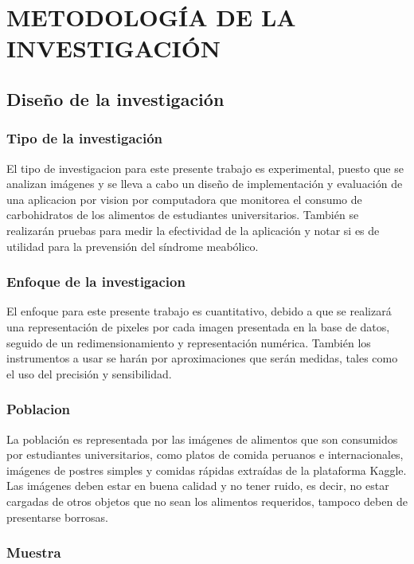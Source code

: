 

\chapter{METODOLOGÍA DE LA INVESTIGACIÓN}

\section{Diseño de la investigación}

\subsection{Tipo de la investigación}

El tipo de investigacion para este presente trabajo es experimental, puesto que se  analizan imágenes y se lleva a cabo un diseño de implementación y evaluación de una aplicacion por vision por computadora que monitorea el consumo de carbohidratos de los alimentos de estudiantes universitarios. También se realizarán pruebas para medir la efectividad de la aplicación y notar si es de utilidad para la prevensión del síndrome meabólico.

\subsection{Enfoque de la investigacion}

El enfoque para este presente trabajo es cuantitativo, debido a que se realizará una representación de pixeles por cada imagen  presentada en la base de datos, seguido de un redimensionamiento y representación numérica. También los instrumentos a usar se harán por aproximaciones que serán medidas, tales como el uso del precisión y sensibilidad. 

\subsection{Poblacion}

La población es representada por las imágenes de alimentos que son consumidos por estudiantes universitarios, como platos de comida peruanos e internacionales, imágenes de postres simples y comidas rápidas extraídas de la plataforma Kaggle. Las imágenes deben estar en buena calidad y no tener ruido, es decir, no estar cargadas de otros objetos que no sean los alimentos requeridos, tampoco deben de presentarse borrosas. 

\subsection{Muestra}


